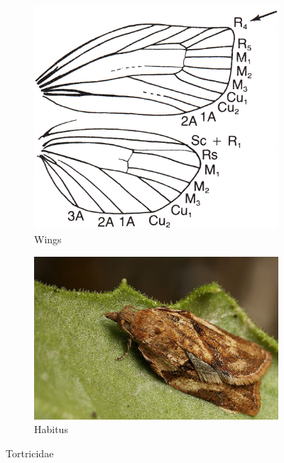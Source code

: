 \documentclass[letterpaper, 11pt]{article}
\begin{document}
\begin{figure}[ht!]
    \centering
    \begin{subfigure}[ht!]{0.38\textwidth}
        \includegraphics[width=\textwidth]{image46}
        \caption{Wings}
        \label{fig:tortricid1}
    \end{subfigure}
    \qquad %
    \begin{subfigure}[ht!]{0.48\textwidth}
        \includegraphics[width=\textwidth]{image45}
        \caption{Habitus}
        \label{fig:tortricid2}
    \end{subfigure}
    \caption{Tortricidae}\label{fig:tortricids}
\end{figure}
\end{document}
